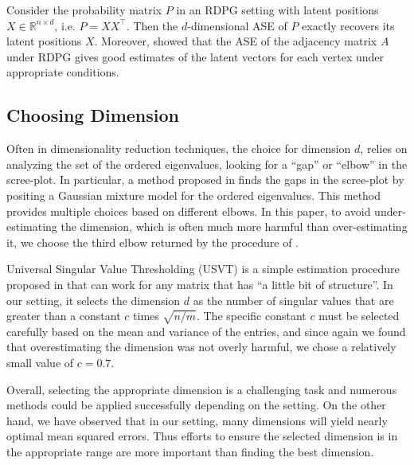 Consider the probability matrix $P$ in an RDPG setting with latent positions $X \in \mathbb{R}^{n \times d}$, i.e. $P = X X^{\top}$. Then the $d$-dimensional ASE of $P$ exactly recovers its latent positions $X$.
Moreover, \citet{sussman2014consistent} showed that the ASE of the adjacency matrix $A$ under RDPG gives good estimates of the latent vectors for each vertex under appropriate conditions.




\subsection{Choosing Dimension}
\label{sec:dim_select}
Often in dimensionality reduction techniques, the choice for dimension $d$, relies on analyzing the set of the ordered eigenvalues, looking for a ``gap'' or ``elbow'' in the scree-plot. 
In particular, a method proposed in \citep{zhu2006automatic} finds the gaps in the scree-plot by positing a Gaussian mixture model for the ordered eigenvalues. This method provides multiple choices based on different elbows. In this paper, to avoid under-estimating the dimension, which is often much more harmful than over-estimating it, we choose the third elbow returned by the procedure of \citep{zhu2006automatic}.

Universal Singular Value Thresholding (USVT) is a simple estimation procedure proposed in \citet{chatterjee2015matrix} that can work for any matrix that has ``a little bit of structure''. 
In our setting, it selects the dimension $d$ as the number of singular values that are greater than a constant $c$ times $\sqrt{n/m}$.
The specific constant $c$ must be selected carefully based on the mean and variance of the entries, and since again we found that overestimating the dimension was not overly harmful, we chose a relatively small value of $c=0.7$.

Overall, selecting the appropriate dimension is a challenging task and numerous methods could be applied successfully depending on the setting.
On the other hand, we have observed that in our setting, many dimensions will yield nearly optimal mean squared errors. 
Thus efforts to ensure the selected dimension is in the appropriate range are more important than finding the best dimension.





